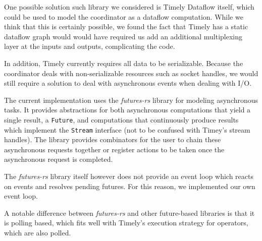 One possible solution such library we considered is Timely Dataflow itself, which could
be used to model the coordinator as a dataflow computation.
While we think that this is certainly possible, we found the fact that Timely
has a static dataflow graph would would have required us add an additional
multiplexing layer at the inputs and outputs, complicating the code. 

In addition, Timely currently requires all data to be serializable. Because
the coordinator deals with non-serializable resources such as socket handles,
we would still require a solution to deal with asynchronous events when dealing
with I/O.

The current implementation uses the \emph{futures-rs} library for modeling
asynchronous tasks. It provides abstractions for both asynchronous computations
that yield a single result, a \lstinline{Future}, and computations that
continuously produce results which implement the \lstinline{Stream} interface
(not to be confused with Timey's stream handles). The library provides combinators
for the user to chain these asynchronous requests together or register actions
to be taken once the asynchronous request is completed.

The \emph{futures-rs} library itself however does not provide an event loop
which reacts on events and resolves pending futures. For this reason, we implemented
our own event loop. 

A notable difference between \emph{futures-rs} and other future-based libraries
is that it is polling based, which fits well with Timely's execution strategy
for operators, which are also polled.
